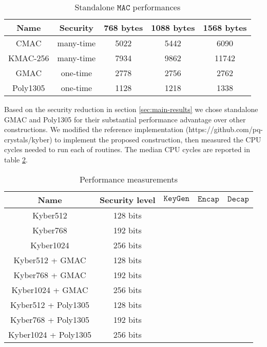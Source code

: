 \documentclass[floatrow,journal=tches,submission]{iacrtrans}
\newcommand{\keygen}{\texttt{KeyGen}}
\newcommand{\encap}{\texttt{Encap}}
\newcommand{\decap}{\texttt{Decap}}
\newcommand{\mac}{\texttt{MAC}}
\begin{document}
\begin{table}[H]
    \centering
    \begin{tabular}{|c|c|c|c|c|}
        \hline
        Name & Security & 768 bytes & 1088 bytes & 1568 bytes \\
        \hline
        CMAC & many-time & 5022 & 5442 & 6090 \\
        \hline
        KMAC-256 & many-time & 7934 & 9862 & 11742 \\
        \hline
        GMAC & one-time & 2778 & 2756 & 2762 \\
        \hline
        Poly1305 & one-time & 1128 & 1218 & 1338 \\
        \hline
    \end{tabular}
    \caption{Standalone $\mac$ performances}\label{tbl:standalone-mac-perf}
\end{table}

Based on the security reduction in section \ref{sec:main-results} we chose standalone GMAC and Poly1305 for their substantial performance advantage over other constructions. We modified the reference implementation (https://github.com/pq-crystals/kyber) to implement the proposed construction, then measured the CPU cycles needed to run each of routines. The median CPU cycles are reported in table \ref{tbl:kyber-ae-perf}.

\begin{table}[H]
    \centering
    \begin{tabular}{|c|c|c|c|c|}
        \hline
        Name & Security level & $\keygen$ & $\encap$ & $\decap$ \\
        \hline
        Kyber512 & 128 bits &  & &  \\
        \hline
        Kyber768 & 192 bits &  & &  \\
        \hline
        Kyber1024 & 256 bits &  & &  \\
        \hline
        Kyber512 + GMAC& 128 bits &  & &  \\
        \hline
        Kyber768 + GMAC& 192 bits &  & &  \\
        \hline
        Kyber1024 + GMAC& 256 bits &  & &  \\
        \hline
        Kyber512 + Poly1305& 128 bits &  & &  \\
        \hline
        Kyber768 + Poly1305& 192 bits &  & &  \\
        \hline
        Kyber1024 + Poly1305& 256 bits &  & &  \\
        \hline
    \end{tabular}
    \caption{Performance measurements}\label{tbl:kyber-ae-perf}
\end{table}
\end{document}

